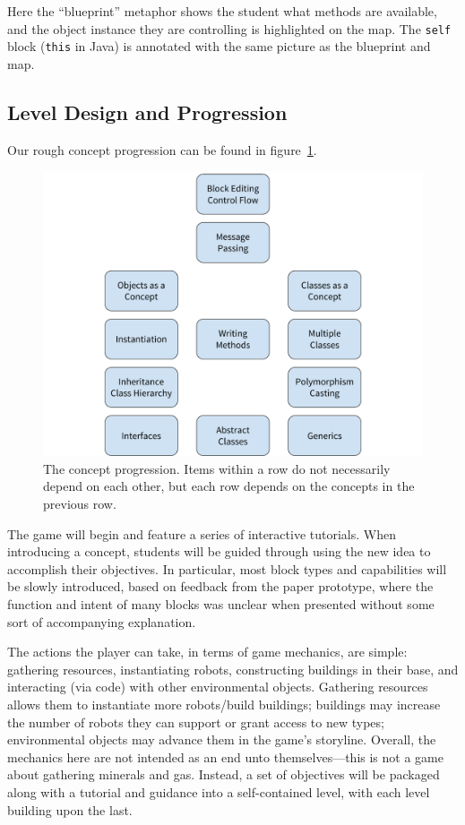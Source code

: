 \documentclass[12pt,notitlepage]{article}
\begin{document}
Here the ``blueprint'' metaphor shows the student what methods are
available, and the object instance they are controlling is highlighted
on the map. The \texttt{self} block (\texttt{this} in Java) is
annotated with the same picture as the blueprint and map.

\subsection{Level Design and Progression}

Our rough concept progression can be found in figure~\ref{fig:progression}.

\begin{figure}[h]
  \centering
  \includegraphics[width=\textwidth]{concept_progression.pdf}
  \caption{The concept progression. Items within a row do not
    necessarily depend on each other, but each row depends on the
    concepts in the previous row.}\label{fig:progression}
\end{figure}

The game will begin and feature a series of interactive
tutorials. When introducing a concept, students will be guided through
using the new idea to accomplish their objectives. In particular, most
block types and capabilities will be slowly introduced, based on
feedback from the paper prototype, where the function and intent of
many blocks was unclear when presented without some sort of
accompanying explanation.

The actions the player can take, in terms of game mechanics, are
simple: gathering resources, instantiating robots, constructing
buildings in their base, and interacting (via code) with other
environmental objects. Gathering resources allows them to instantiate
more robots/build buildings; buildings may increase the number of
robots they can support or grant access to new types; environmental
objects may advance them in the game's storyline. Overall, the
mechanics here are not intended as an end unto themselves---this is
not a game about gathering minerals and gas. Instead, a set of
objectives will be packaged along with a tutorial and guidance into a
self-contained level, with each level building upon the last.
\end{document}

